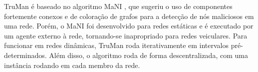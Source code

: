 \begin{resumoextendido}
%	
%
%	
%	
%	
%	
	
	TruMan é baseado no algoritmo MaNI \citep{vernize2013dissertation}, que sugeriu o uso de componentes fortemente conexos e de coloração de grafos para a detecção de nós maliciosos em uma rede.
	Porém, o MaNI foi desenvolvido para redes estáticas e é executado por um agente externo à rede, tornando-se inapropriado para redes veiculares.
	Para funcionar em redes dinâmicas, TruMan roda iterativamente em intervalos pré-determinados.
	Além disso, o algoritmo roda de forma descentralizada, com uma instância rodando em cada membro da rede.
	

\end{resumoextendido}
